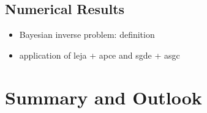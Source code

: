 \section{Numerical Results}
\label{sec:da-numerical-results}


\begin{itemize}
\item Bayesian inverse problem: definition
\item application of leja + apce and sgde + asgc
\end{itemize}


\chapter{Summary and Outlook}
\label{cha:summary-outlook}



